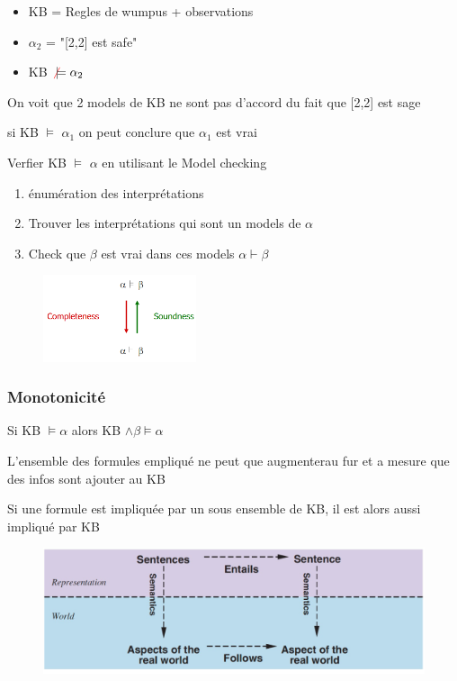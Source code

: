 		\begin{itemize}
			\item KB = Regles de wumpus + observations
			\item $\alpha_2$ = "[2,2] est safe"
			\item KB $\textcolor{red}{\not} \models \alpha_2$
		\end{itemize}
		
		On voit que 2 models de KB ne sont pas d'accord du fait que [2,2] est sage
		
		
		si KB $\models$ $\alpha_1$ on peut conclure que $\alpha_1$ est vrai
		
		Verfier KB $\models$ $\alpha$ en utilisant le Model checking
		
		\begin{enumerate}
			\item énumération des interprétations
			\item Trouver les interprétations qui sont un models de $\alpha$
			\item Check que $\beta$ est vrai dans ces models $\alpha \vdash \beta$
		\end{enumerate}
		
		\begin{figure}[htp]	
			\centering
			\includegraphics[width=0.4\textwidth]{img/KBA2.png}
		\end{figure}
		
		\subsubsection{Monotonicité}
			Si KB $\models \alpha$ alors KB $\land \beta \models \alpha$
			
			L'ensemble des formules empliqué ne peut que augmenterau fur et a mesure que des infos sont ajouter au KB
			
			Si une formule est impliquée par un sous ensemble de KB, il est alors aussi impliqué par KB
			
			\begin{figure}[htp]	
			\centering
			\includegraphics[width=\textwidth]{img/process.png}
		\end{figure}
		
